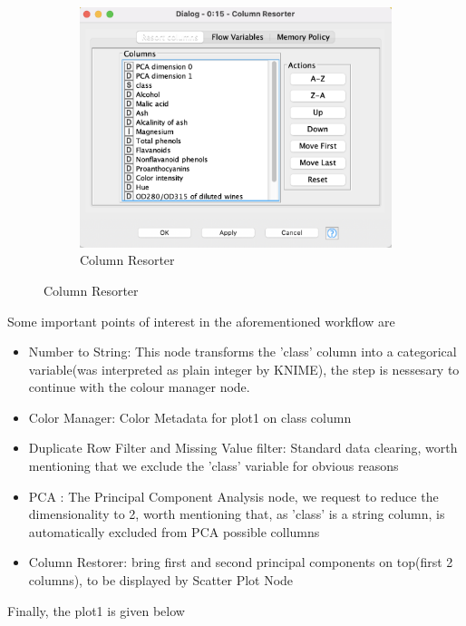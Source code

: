 \documentclass[11pt]{article}
\begin{document}
\begin{figure}[H]
\begin{subfigure}{0.4\textwidth}
					\includegraphics[width=\textwidth]{res/t1/t11/t11-column-resorter-conf}
					\caption{Column Resorter}
					\label{fig:third}
				\end{subfigure}	
				\label{fig:figures}
			\end{figure}
			\fi
			Some important points of interest in the aforementioned workflow are
			\begin{itemize}
				\item Number to String: This node transforms the 'class' column into a categorical variable(was interpreted as plain integer by KNIME), the step is nessesary to continue with the colour manager node.
				\item Color Manager: Color Metadata for plot1 on class column
				\item Duplicate Row Filter and Missing Value filter: Standard data clearing, worth mentioning that we exclude the 'class' variable for obvious reasons
				\item PCA : The Principal Component Analysis node, we request to reduce the dimensionality to 2, worth mentioning that, as 'class' is a string column, is automatically excluded from PCA	possible collumns
				\item Column Restorer: bring first and second principal components on top(first 2 columns), to be displayed by Scatter Plot Node
			\end{itemize}
			Finally, the plot1 is given below

\end{document}
